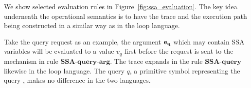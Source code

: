 We show selected evaluation rules in Figure~\ref{fig:ssa_evaluation}.  The key idea underneath the operational semantics is to have the trace and the execution path being constructed in a similar way as in the {loop} language. 

Take the query request as an example, the argument ${\bf{{e_q}}}$ which may contain SSA variables will be evaluated to a value $v_q$ first before the request is sent to the mechanism in rule $\textbf{SSA-query-arg}$. The trace expands in the rule $\textbf{SSA-query}$ likewise in the {loop} language. The query $q$, a primitive symbol representing the query , makes no difference in the two languages. 
%
{\footnotesize
\begin{figure}
\end{figure}}
